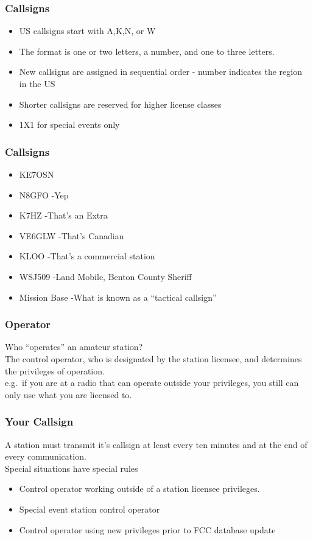 \documentclass[10pt, handout]{beamer}
\begin{document}
\begin{frame}
\frametitle{Callsigns}
\begin{itemize}
\item US callsigns start with A,K,N, or W
\item The format is one or two letters, a number, and one to three letters.
\item New callsigns are assigned in sequential order - number indicates the region in the US
\item Shorter callsigns are reserved for higher license classes
\item 1X1 for special events only
\end{itemize}
\end{frame}

\begin{frame}
\frametitle{Callsigns}
\begin{itemize}
\item KE7OSN
\item N8GFO -Yep\pause
\item K7HZ -That's an Extra\pause
\item VE6GLW -That's Canadian\pause
\item KLOO -That's a commercial station\pause
\item WSJ509 -Land Mobile, Benton County Sheriff\pause
\item Mission Base -What is known as a ``tactical callsign''\pause
\end{itemize}
\end{frame}

\begin{frame}
\frametitle{Operator}
Who ``operates'' an amateur station? \pause \\
The control operator, who is designated by the station licensee, and determines the privileges of operation.\\
e.g.\ if you are at a radio that can operate outside your privileges, you still can only use what you are licensed to.
\end{frame}

\begin{frame}
\frametitle{Your Callsign}
A station must transmit it's callsign at least every ten minutes and at the end of every communication.\\
Special situations have special rules\\
\begin{itemize}
\item Control operator working outside of a station licensee privileges.
\item Special event station control operator
\item Control operator using new privileges prior to FCC database update
\end{itemize}
\end{frame}
\end{document}
